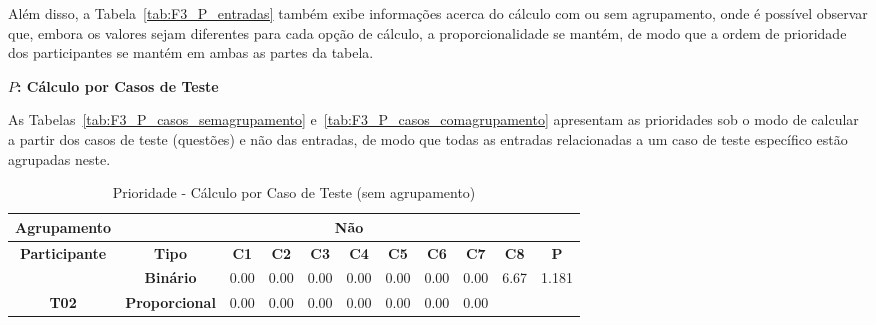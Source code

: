 Além disso, a Tabela~\ref{tab:F3_P_entradas} também exibe informações acerca do cálculo com ou sem agrupamento, onde é possível observar que, embora os valores sejam diferentes para cada opção de cálculo, a proporcionalidade se mantém, de modo que a ordem de prioridade dos participantes se mantém em ambas as partes da tabela.

\textbf{$P$: Cálculo por Casos de Teste}

As Tabelas~\ref{tab:F3_P_casos_semagrupamento} e~\ref{tab:F3_P_casos_comagrupamento} apresentam as prioridades sob o modo de calcular a partir dos casos de teste (questões) e não das entradas, de modo que todas as entradas relacionadas a um caso de teste específico estão agrupadas neste.

\begin{table}[htbp]
	\centering
	\caption{Prioridade - Cálculo por Caso de Teste (sem agrupamento)}
	\begin{tabular}{|c|cccccccccc|}
		\hline
		\cellcolor[HTML]{F2F2F2}\textbf{Agrupamento} &
		\multicolumn{10}{c|}{Não} \\ \hline
		\rowcolor[HTML]{D0CECE} 
		\textbf{Participante} &
		\multicolumn{1}{c|}{\cellcolor[HTML]{D0CECE}\textbf{Tipo}} &
		\multicolumn{1}{c|}{\cellcolor[HTML]{D0CECE}\textbf{C1}} &
		\multicolumn{1}{c|}{\cellcolor[HTML]{D0CECE}\textbf{C2}} &
		\multicolumn{1}{c|}{\cellcolor[HTML]{D0CECE}\textbf{C3}} &
		\multicolumn{1}{c|}{\cellcolor[HTML]{D0CECE}\textbf{C4}} &
		\multicolumn{1}{c|}{\cellcolor[HTML]{D0CECE}\textbf{C5}} &
		\multicolumn{1}{c|}{\cellcolor[HTML]{D0CECE}\textbf{C6}} &
		\multicolumn{1}{c|}{\cellcolor[HTML]{D0CECE}\textbf{C7}} &
		\multicolumn{1}{c|}{\cellcolor[HTML]{D0CECE}\textbf{C8}} &
		\textbf{P} \\ \hline
		&
		\multicolumn{1}{c|}{\textbf{Binário}} &
		\multicolumn{1}{c|}{0.00} &
		\multicolumn{1}{c|}{0.00} &
		\multicolumn{1}{c|}{0.00} &
		\multicolumn{1}{c|}{0.00} &
		\multicolumn{1}{c|}{0.00} &
		\multicolumn{1}{c|}{0.00} &
		\multicolumn{1}{c|}{0.00} &
		\multicolumn{1}{c|}{6.67} &
		1.181 \\ \cline{2-11} 
		\multirow{-2}{*}{\textbf{T02}} &
		\multicolumn{1}{c|}{\cellcolor[HTML]{F2F2F2}\textbf{Proporcional}} &
		\multicolumn{1}{c|}{\cellcolor[HTML]{F2F2F2}0.00} &
		\multicolumn{1}{c|}{\cellcolor[HTML]{F2F2F2}0.00} &
		\multicolumn{1}{c|}{\cellcolor[HTML]{F2F2F2}0.00} &
		\multicolumn{1}{c|}{\cellcolor[HTML]{F2F2F2}0.00} &
		\multicolumn{1}{c|}{\cellcolor[HTML]{F2F2F2}0.00} &
		\multicolumn{1}{c|}{\cellcolor[HTML]{F2F2F2}0.00} &
		\multicolumn{1}{c|}{\cellcolor[HTML]{F2F2F2}0.00} &

\end{tabular}
\end{table}
